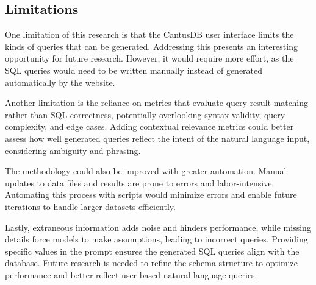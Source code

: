 \subsection{Limitations}
One limitation of this research is that the CantusDB user interface limits the kinds of queries that can be generated. Addressing this presents an interesting opportunity for future research. However, it would require more effort, as the SQL queries would need to be written manually instead of generated automatically by the website.

Another limitation is the reliance on metrics that evaluate query result matching rather than SQL correctness, potentially overlooking syntax validity, query complexity, and edge cases. Adding contextual relevance metrics could better assess how well generated queries reflect the intent of the natural language input, considering ambiguity and phrasing.

The methodology could also be improved with greater automation. Manual updates to data files and results are prone to errors and labor-intensive. Automating this process with scripts would minimize errors and enable future iterations to handle larger datasets efficiently.

Lastly, extraneous information adds noise and hinders performance, while missing details force models to make assumptions, leading to incorrect queries. Providing specific values in the prompt ensures the generated SQL queries align with the database. Future research is needed to refine the schema structure to optimize performance and better reflect user-based natural language queries.